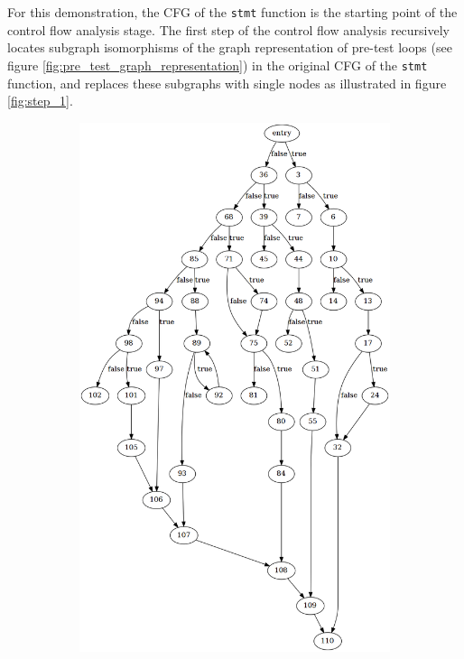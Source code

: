 For this demonstration, the CFG of the \texttt{stmt} function is the starting point of the control flow analysis stage. The first step of the control flow analysis recursively locates subgraph isomorphisms of the graph representation of pre-test loops (see figure \ref{fig:pre_test_graph_representation}) in the original CFG of the \texttt{stmt} function, and replaces these subgraphs with single nodes as illustrated in figure \ref{fig:step_1}.

\begin{figure}[htbp]
	\centering
	\begin{subfigure}[t]{0.45\textwidth}
		\includegraphics[width=\textwidth]{appendices/control_flow_analysis_example/stmt_0.png}

\end{subfigure}
\end{figure}
